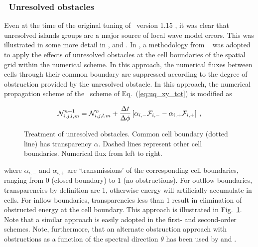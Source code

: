 \vsssub
\subsubsection{~Unresolved obstacles} \label{sub:num_obst}

\noindent
Even at the time of the original tuning of \ws\ version 1.15
\citep{tol:OMB02a}, it was clear that unresolved islands groups are a major
source of local wave model errors. This was illustrated in some more detail in
\citet[][Fig.~3]{tol:Waves01a}, and \citet[][Fig.~8]{tol:WaF02}. In \ws, a
methodology from \swan\ \citep{art:BRH99,man:SWAN3} was adopted to apply the
effects of unresolved obstacles at the cell boundaries of the spatial grid
within the numerical scheme. In this approach, the numerical fluxes between
cells through their common boundary are suppressed according to the degree of
obstruction provided by the unresolved obstacle. In this approach, the
numerical propagation scheme of the \uq\ scheme of Eq.~(\ref{eq:uq_xy_tot}) is
modified as


\begin{equation}
{\cal N}_{i,j,l,m}^{n+1} = {\cal N}_{i,j,l,m}^n +
\frac{\Delta t}{\Delta \phi} \left [ \alpha_{i,-} {\cal F}_{i,-} - \alpha_{i,+} {\cal F}_{i,+} \right ]
\: , \label{eq:uq_xy_obstr} \end{equation}

\begin{figure} \begin{center}
\caption{Treatment of unresolved obstacles. Common cell
         boundary (dotted line) has transparency $\alpha$. Dashed lines
         represent other cell boundaries. Numerical flux from left to right.}
         \label{fig:obstr} \botline
\end{center}
\end{figure}

\noindent
where $\alpha_{i,-}$ and $\alpha_{i,+}$ are `transmissions' of the
corresponding cell boundaries, ranging from 0 (closed boundary) to 1 (no
obstructions). For outflow boundaries, transparencies by definition are 1,
otherwise energy will artificially accumulate in cells. For inflow boundaries,
transparencies less than 1 result in elimination of obstructed energy at the
cell boundary. This approach is illustrated in
Fig.~\ref{fig:obstr}. Note that a similar approach is easily adopted in the
first- and second-order schemes.  Note, furthermore, that an alternate
obstruction approach with obstructions as a function of the spectral direction
$\theta$ has been used by \cite{art:HY96} and \cite{art:HMM00}.

